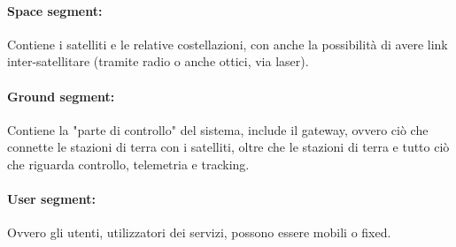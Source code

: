 \paragraph{Space segment:} Contiene i satelliti e le relative costellazioni, con anche la possibilità di avere link inter-satellitare (tramite radio o anche ottici, via laser).

\paragraph{Ground segment:} Contiene la "parte di controllo" del sistema, include il gateway, ovvero ciò che connette le stazioni di terra con i satelliti, oltre che le stazioni di terra e tutto ciò che riguarda controllo, telemetria e tracking.

\paragraph{User segment:} Ovvero gli utenti, utilizzatori dei servizi, possono essere mobili o fixed.


